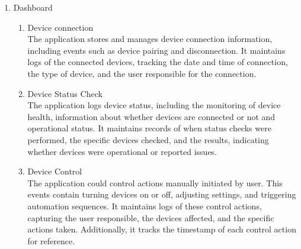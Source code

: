 \documentclass[11pt, conference]{IEEEtran}
\begin{document}
\begin{enumerate}[label=\arabic*]
    \item {\large{Dashboard}}
    \begin{enumerate}[label=\alph*]
        \item {\large{Device connection}}\\
        The application stores and manages device connection information, including events such as device pairing and disconnection. It maintains logs of the connected devices, tracking the date and time of connection, the type of device, and the user responsible for the connection.\\
    
        \item {\large{Device Status Check}}\\
        The application logs device status, including the monitoring of device health, information about whether devices are connected or not and operational status. It maintains records of when status checks were performed, the specific devices checked, and the results, indicating whether devices were operational or reported issues.\\
    
        \item {\large{Device Control}}\\
        The application could control actions manually initiated by user. This events contain turning devices on or off, adjusting settings, and triggering automation sequences. It maintains logs of these control actions, capturing the user responsible, the devices affected, and the specific actions taken. Additionally, it tracks the timestamp of each control action for reference.\\



    \end{enumerate}


\end{enumerate}
\end{document}
